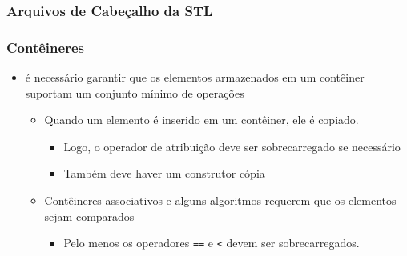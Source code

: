 \documentclass[xcolor={dvipsnames,table},aspectratio=169]{beamer}
\begin{document}
\begin{frame}\frametitle{Arquivos de Cabeçalho da STL}
{\small
\begin{center}
\end{center}
}
\end{frame}

\begin{frame}\frametitle{Contêineres}
\begin{itemize}
	\item é necessário garantir que os elementos armazenados em um contêiner suportam um conjunto mínimo de operações
	\begin{itemize}
		\item Quando um elemento é inserido em um contêiner, ele é copiado.
		\begin{itemize}
			\item Logo, o operador de atribuição deve ser sobrecarregado se necessário
			\item Também deve haver um construtor cópia
		\end{itemize}
		\item Contêineres associativos e alguns algoritmos requerem que os elementos sejam comparados
		\begin{itemize}
			\item Pelo menos os operadores \texttt{==} e \texttt{<} devem ser sobrecarregados.
		\end{itemize}
	\end{itemize}
\end{itemize}
\end{frame}
\end{document}
